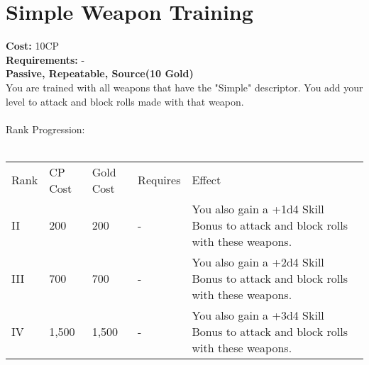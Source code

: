 \section{Simple Weapon Training}\label{perk:simpleWeaponTraining}
\textbf{Cost:} 10CP\\
\textbf{Requirements:} -\\
\textbf{Passive, Repeatable, Source(10 Gold)}\\
You are trained with all weapons that have the "Simple" descriptor.
You add your level to attack and block rolls made with that weapon.\\
\\
Rank Progression:\\
\\
\begin{longtable}{l | l | l | l | p{9cm}}
	Rank & CP Cost & Gold Cost & Requires & Effect\\
	II & 200 & 200 & - & You also gain a +1d4 Skill Bonus to attack and block rolls with these weapons.\\
	III & 700 & 700 & - & You also gain a +2d4 Skill Bonus to attack and block rolls with these weapons.\\
	IV & 1,500 & 1,500 & - & You also gain a +3d4 Skill Bonus to attack and block rolls with these weapons.\\
\end{longtable}